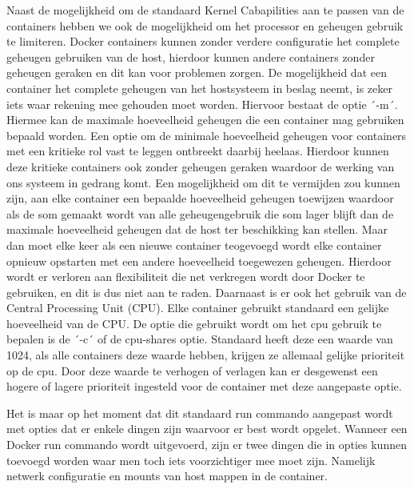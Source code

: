 Naast de mogelijkheid om de standaard Kernel Cabapilities aan te passen van de containers hebben we ook de mogelijkheid om het processor en geheugen gebruik te limiteren. Docker containers kunnen zonder verdere configuratie het complete geheugen gebruiken van de host, hierdoor kunnen andere containers zonder geheugen geraken en dit kan voor problemen zorgen. De mogelijkheid dat een container het complete geheugen van het hostsysteem in beslag neemt, is zeker iets waar rekening mee gehouden moet worden. Hiervoor bestaat de optie ´-m´. Hiermee kan de maximale hoeveelheid geheugen die een container mag gebruiken bepaald worden. Een optie om de minimale hoeveelheid geheugen voor containers met een kritieke rol vast te leggen ontbreekt daarbij heelaas. Hierdoor kunnen deze kritieke containers ook zonder geheugen geraken waardoor de werking van ons systeem in gedrang komt. Een mogelijkheid om dit te vermijden zou kunnen zijn, aan elke container een bepaalde hoeveelheid geheugen toewijzen waardoor als de som gemaakt wordt van alle geheugengebruik die som lager blijft dan de maximale hoeveelheid geheugen dat de host ter beschikking kan stellen. Maar dan moet elke keer als een nieuwe container teogevoegd wordt elke container opnieuw opstarten met een andere hoeveelheid toegewezen geheugen. Hierdoor wordt er verloren aan flexibiliteit die  net verkregen wordt door Docker te gebruiken, en dit is dus niet aan te raden. Daarnaast is er ook het gebruik van de Central Processing Unit (CPU). Elke container gebruikt standaard een gelijke hoeveelheid van de CPU. De optie die gebruikt wordt om het cpu gebruik te bepalen is de ´-c´ of de cpu-shares optie. Standaard heeft deze een waarde van 1024, als alle containers deze waarde hebben, krijgen ze allemaal gelijke prioriteit op de cpu. Door deze waarde te verhogen of verlagen kan er desgewenst een hogere of lagere prioriteit ingesteld voor de container met deze aangepaste optie. 

Het is maar op het moment dat dit standaard run commando aangepast wordt met opties dat er enkele dingen zijn waarvoor er best wordt opgelet. Wanneer een Docker run commando wordt uitgevoerd, zijn er twee dingen die in opties kunnen toevoegd worden waar men toch iets voorzichtiger mee moet zijn. Namelijk netwerk configuratie en mounts van host mappen in de container.

